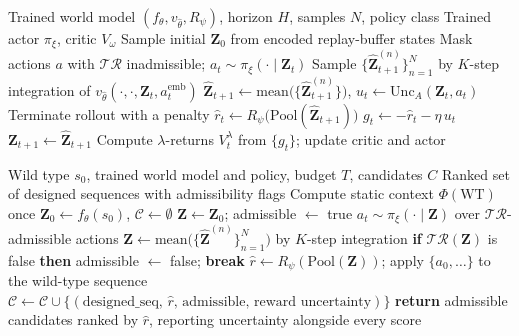 \documentclass[12pt, a4paper]{article}
\begin{document}
\begin{algorithm}[H]
\caption{ProteinDreamer -- Imagination-Based Policy Training}
\label{alg:policy}
\begin{algorithmic}[1]
\REQUIRE Trained world model $(f_\theta, v_{\hat{\theta}}, R_\psi)$, horizon $H$, samples $N$, policy class
\ENSURE Trained actor $\pi_\xi$, critic $V_\omega$
\REPEAT
    \STATE Sample initial $\mathbf{Z}_0$ from encoded replay-buffer states
        \STATE Mask actions $a$ with $\mathcal{T}\!\mathcal{R}$ inadmissible; \quad $a_t \sim \pi_\xi(\cdot \mid \mathbf{Z}_t)$
        \STATE Sample $\{\hat{\mathbf{Z}}_{t+1}^{(n)}\}_{n=1}^{N}$ by $K$-step integration of $v_{\hat{\theta}}(\cdot, \cdot, \mathbf{Z}_t, a_t^\text{emb})$
        \STATE $\hat{\mathbf{Z}}_{t+1} \leftarrow \mathrm{mean}\big(\{\hat{\mathbf{Z}}_{t+1}^{(n)}\}\big)$, \quad $u_t \leftarrow \mathrm{Unc}_A(\mathbf{Z}_t, a_t)$
            \STATE Terminate rollout with a penalty 
        \ENDIF
        \STATE $\hat{r}_t \leftarrow R_\psi\big(\mathrm{Pool}(\hat{\mathbf{Z}}_{t+1})\big)$
        \STATE $g_t \leftarrow -\hat{r}_t - \eta\,u_t$ 
        \STATE $\mathbf{Z}_{t+1} \leftarrow \hat{\mathbf{Z}}_{t+1}$
    \ENDFOR
    \STATE Compute $\lambda$-returns $V_t^{\lambda}$ from $\{g_t\}$; update critic and actor
\end{algorithmic}
\end{algorithm}

\begin{algorithm}[H]
\caption{ProteinDreamer -- Inference (Protein Design)}
\label{alg:inference}
\begin{algorithmic}[1]
\REQUIRE Wild type $s_0$, trained world model and policy, budget $T$, candidates $C$
\ENSURE Ranked set of designed sequences with admissibility flags
\STATE Compute static context $\Phi(\mathrm{WT})$ once 
\STATE $\mathbf{Z}_0 \leftarrow f_\theta(s_0)$, \quad $\mathcal{C} \leftarrow \emptyset$
    \STATE $\mathbf{Z} \leftarrow \mathbf{Z}_0$; \quad admissible $\leftarrow$ true
        \STATE $a_t \sim \pi_\xi(\cdot \mid \mathbf{Z})$ over $\mathcal{T}\!\mathcal{R}$-admissible actions
        \STATE $\mathbf{Z} \leftarrow \mathrm{mean}\big(\{\hat{\mathbf{Z}}^{(n)}\}_{n=1}^{N}\big)$ by $K$-step integration
        \STATE \textbf{if} $\mathcal{T}\!\mathcal{R}(\mathbf{Z})$ is false \textbf{then} admissible $\leftarrow$ false; \textbf{break}
    \ENDFOR
    \STATE $\hat{r} \leftarrow R_\psi(\mathrm{Pool}(\mathbf{Z}))$; apply $\{a_0, \ldots\}$ to the wild-type sequence
    \STATE $\mathcal{C} \leftarrow \mathcal{C} \cup \{(\text{designed\_seq},\, \hat{r},\, \text{admissible},\, \text{reward uncertainty})\}$
\ENDFOR
\STATE \textbf{return} admissible candidates ranked by $\hat{r}$, reporting uncertainty alongside every score
\STATE {}
\end{algorithmic}
\end{algorithm}
\end{document}
